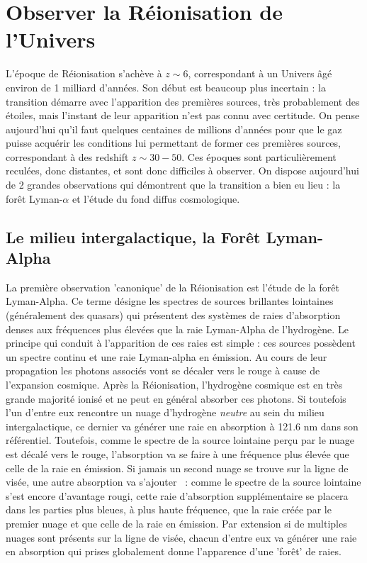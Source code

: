 \section{Observer la Réionisation de l'Univers}
L'époque de Réionisation s'achève à $z\sim 6$, correspondant à un Univers âgé environ de 1 milliard d'années. Son début est beaucoup plus incertain : la transition démarre avec l'apparition des premières sources, très probablement des étoiles, mais l'instant de leur apparition n'est pas connu avec certitude. On pense aujourd'hui qu'il faut quelques centaines de millions d'années pour que le gaz puisse acquérir les conditions lui permettant de former ces premières sources, correspondant à des redshift $z\sim 30- 50$. Ces époques sont particulièrement reculées, donc distantes, et sont donc difficiles à observer.  On dispose aujourd'hui de 2 grandes observations qui démontrent que la transition a bien eu lieu : la forêt Lyman-$\alpha$ et l'étude du fond diffus cosmologique.

\subsection{Le milieu intergalactique, la Forêt Lyman-Alpha}
La première observation 'canonique' de la Réionisation est l'étude de la forêt Lyman-Alpha. Ce terme désigne les spectres de sources brillantes lointaines (généralement des quasars) qui présentent des systèmes de raies d'absorption denses aux fréquences plus élevées que la raie Lyman-Alpha de l'hydrogène. Le principe qui conduit à l'apparition de ces raies est simple : ces sources possèdent un spectre continu et une raie Lyman-alpha en émission. Au cours de leur propagation les photons associés vont se décaler vers le rouge à cause de l'expansion cosmique. Après la Réionisation, l'hydrogène cosmique est en très grande majorité ionisé et ne peut en général absorber ces photons. Si toutefois l'un d'entre eux rencontre un nuage d'hydrogène \textit{neutre} au sein du milieu intergalactique, ce dernier va générer une raie en absorption à 121.6 nm dans son référentiel. Toutefois, comme le spectre de la source lointaine perçu par le nuage est décalé vers le rouge, l'absorption va se faire à une fréquence plus élevée que celle de la raie en émission. Si jamais un second nuage se trouve sur la ligne de visée, une autre absorption va s'ajouter ~: comme le spectre de la source lointaine s'est encore d'avantage rougi, cette raie d'absorption supplémentaire se placera dans les parties plus bleues, à plus haute fréquence, que la raie créée par le premier nuage et que celle de la raie en émission. Par extension si de multiples nuages sont présents sur la ligne de visée, chacun d'entre eux va générer une raie en absorption qui prises globalement donne l'apparence d'une 'forêt' de raies.

